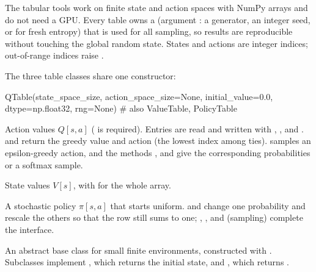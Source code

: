 The tabular tools work on finite state and action spaces with NumPy arrays
and do not need a GPU. Every table owns a 
(argument : a generator, an integer seed, or  for fresh
entropy) that is used for all sampling, so results are reproducible without
touching the global random state. States and actions are integer indices;
out-of-range indices raise .

The three table classes share one constructor:

\begin{pycode}
QTable(state_space_size, action_space_size=None, initial_value=0.0,
       dtype=np.float32, rng=None)          # also ValueTable, PolicyTable
\end{pycode}

\begin{description}[leftmargin=0.6cm,style=nextline]
  \setlength{\emergencystretch}{3em}%
  \item[\code{QTable}] Action values $Q[s, a]$ (
    is required). Entries are read and written with ,
    ,  and .
     and  return the
    greedy value and action (the lowest index among ties). 
    samples an epsilon-greedy action, and the methods
    ,  and
     give the corresponding probabilities or a
    softmax sample.
  \item[\code{ValueTable}] State values $V[s]$, with  for
    the whole array.
  \item[\code{PolicyTable}] A stochastic policy $\pi[s, a]$ that starts
    uniform.  and  change one
    probability and rescale the others so that the row still sums to one;
    , ,
     and  (sampling) complete
    the interface.
  \item[\code{DiscreteEnvironment}] An abstract base class for small finite
    environments, constructed with . Subclasses implement ,
    which returns the initial state, and , which returns
    .
\end{description}

